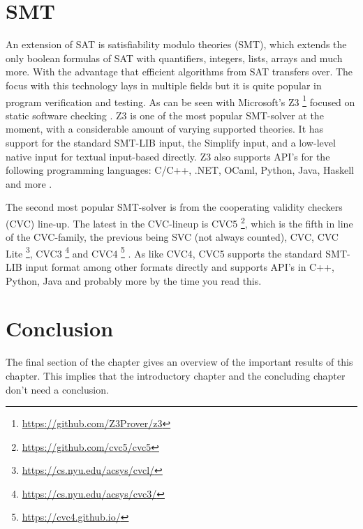 \section{SMT}
\label{CS:SMT}
An extension of SAT is satisfiability modulo theories (SMT), which extends the only boolean formulas of SAT with quantifiers, integers, lists, arrays and much more. With the advantage that efficient algorithms from SAT transfers over. The focus with this technology lays in multiple fields but it is quite popular in program verification and testing. As can be seen with Microsoft's Z3 \footnote{\url{https://github.com/Z3Prover/z3}} focused on static software checking \cite{54moura2008z3}. Z3 is one of the most popular SMT-solver at the moment, with a considerable amount of varying supported theories. It has support for the standard SMT-LIB input, the
Simplify input, and a low-level native input for textual input-based directly. Z3 also supports API's for the following programming languages: C/C++, .NET, OCaml, Python, Java, Haskell and more \cite{64WikiSMT}.

The second most popular SMT-solver is from the cooperating validity checkers (CVC) line-up. The latest in the CVC-lineup is CVC5 \footnote{\url{https://github.com/cvc5/cvc5}}, which is the fifth in line of the CVC-family, the previous being SVC (not always counted), CVC, 
CVC Lite \footnote{\url{https://cs.nyu.edu/acsys/cvcl/}}, 
CVC3 \footnote{\url{https://cs.nyu.edu/acsys/cvc3/}}\cite{71barrett2007cvc3} and 
CVC4 \footnote{\url{https://cvc4.github.io/}} \cite{62barrettcvc5, 63barbosa2022cvc5}. 
As like CVC4, CVC5 supports the standard SMT-LIB input format among other formats directly and supports API's in C++, Python, Java and probably more by the time you read this.

\section{Conclusion}
\label{CS:conclusion}
The final section of the chapter gives an overview of the important results
of this chapter. This implies that the introductory chapter and the
concluding chapter don't need a conclusion.

